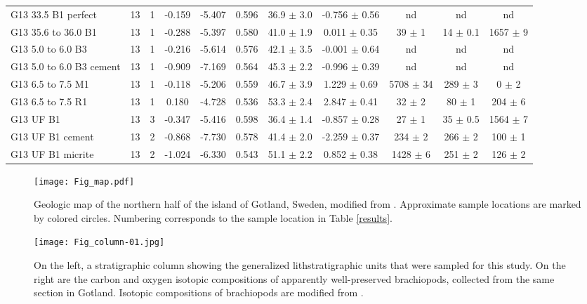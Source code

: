 \documentclass{article}
\begin{document}
\begin{sidewaystable}[htbp]
\begin{tabular}{ | l | c | c | c | c | c | c | c | c | c | c | }
G13 33.5 B1 perfect & 13 & 1 & -0.159 & -5.407 & 0.596 & 36.9 $\pm$ 3.0 & -0.756 $\pm$ 0.56 &  nd  &  nd  &  nd  \\
G13 35.6 to 36.0 B1 & 13 & 1 & -0.288 & -5.397 & 0.580 & 41.0 $\pm$ 1.9 & 0.011 $\pm$ 0.35 & 39 $\pm$ 1 & 14 $\pm$ 0.1 & 1657 $\pm$ 9 \\
G13 5.0 to 6.0 B3 & 13 & 1 & -0.216 & -5.614 & 0.576 & 42.1 $\pm$ 3.5 & -0.001 $\pm$ 0.64 &  nd  &  nd  &  nd  \\
G13 5.0 to 6.0 B3 cement & 13 & 1 & -0.909 & -7.169 & 0.564 & 45.3 $\pm$ 2.2 & -0.996 $\pm$ 0.39 &  nd  &  nd  &  nd  \\
G13 6.5 to 7.5 M1 & 13 & 1 & -0.118 & -5.206 & 0.559 & 46.7 $\pm$ 3.9 & 1.229 $\pm$ 0.69 & 5708 $\pm$ 34 & 289 $\pm$ 3 & 0 $\pm$ 2 \\
G13 6.5 to 7.5 R1 & 13 & 1 & 0.180 & -4.728 & 0.536 & 53.3 $\pm$ 2.4 & 2.847 $\pm$ 0.41 & 32 $\pm$ 2 & 80 $\pm$ 1 & 204 $\pm$ 6 \\
G13 UF B1 & 13 & 3 & -0.347 & -5.416 & 0.598 & 36.4 $\pm$ 1.4 & -0.857 $\pm$ 0.28 & 27 $\pm$ 1 & 35 $\pm$ 0.5 & 1564 $\pm$ 7 \\
G13 UF B1 cement & 13 & 2 & -0.868 & -7.730 & 0.578 & 41.4 $\pm$ 2.0 & -2.259 $\pm$ 0.37 & 234 $\pm$ 2 & 266 $\pm$ 2 & 100 $\pm$ 1 \\
G13 UF B1 micrite & 13 & 2 & -1.024 & -6.330 & 0.543 & 51.1 $\pm$ 2.2 & 0.852 $\pm$ 0.38 & 1428 $\pm$ 6 & 251 $\pm$ 2 & 126 $\pm$ 2 \\
\end{tabular} 
\end{sidewaystable}

\begin{figure}[p]
\centering
\texttt{[image: Fig\_map.pdf]}
\caption{Geologic map of the northern half of the island of Gotland, Sweden, modified from \cite{Calner2004a}. Approximate sample locations are marked by colored circles. Numbering corresponds to the sample location in Table \ref{results}.}
\label{map}
\end{figure}

\begin{figure}[htb]
\centering
\texttt{[image: Fig\_column-01.jpg]}
\caption{On the left, a stratigraphic column showing the generalized lithstratigraphic units that were sampled for this study. On the right are the carbon and oxygen isotopic compositions of apparently well-preserved brachiopods, collected from the same section in Gotland. Isotopic compositions of brachiopods are modified from \cite{Bickert1997}.}
\label{column}
\end{figure}
\end{document}
